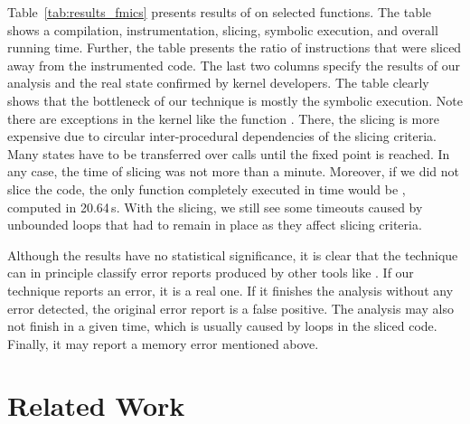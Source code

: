 Table~\ref{tab:results_fmics} presents results of \symbio on selected
functions.  The table shows a compilation, instrumentation, slicing, symbolic
execution, and overall running time. Further, the table presents the ratio
of instructions that were sliced away from the instrumented \llvm code.  The
last two columns specify the results of our analysis and the real state
confirmed by kernel developers. The table clearly shows that the bottleneck of
our technique is mostly the symbolic execution. Note there are exceptions in
the kernel like the function . There, the slicing
is more expensive due to circular inter-procedural dependencies of the slicing
criteria. Many states have to be transferred over calls until the fixed point
is reached. In any case, the time of slicing was not more than a minute.
Moreover, if we did not slice the code, the only function completely executed
in time would be , computed in 20.64\,s. With the
slicing, we still see some timeouts caused by unbounded loops that had to
remain in place as they affect slicing criteria.

Although the results have no statistical significance, it is clear that the
technique can in principle classify error reports produced by other tools like
\stan. If our technique reports an error, it is a real one. If it finishes the
analysis without any error detected, the original error report is a false
positive. The analysis may also not finish in a given time, which is usually
caused by loops in the sliced code. Finally, it may report a memory error
mentioned above.


\section{Related Work} \label{sec:fmics_related}

